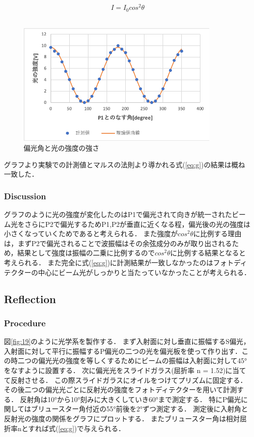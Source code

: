 \documentclass[11pt, a4paper]{jsarticle}
\begin{document}
\begin{equation}
    I = I_0cos^2\theta \label{eq:g}
\end{equation}\\

\begin{figure}[htbp]
 \begin{center}
  \includegraphics[width=100mm]{fig18.png}
 \end{center}
 \caption{偏光角と光の強度の強さ}
 \label{fig:18}
\end{figure}

グラフより実験での計測値とマルスの法則より導かれる式(\ref{eq:g})の結果は概ね一致した．

\subsubsection{Discussion}
グラフのように光の強度が変化したのはP1で偏光されて向きが統一されたビーム光をさらにP2で偏光するためP1,P2が垂直に近くなる程，偏光後の光の強度は小さくなっていくためであると考えられる．
また強度が$cos^2\theta$に比例する理由は，まずP2で偏光されることで波振幅はその余弦成分のみが取り出されるため，結果として強度は振幅の二乗に比例するので$cos^2\theta$に比例する結果となると考えられる．
また完全に式(\ref{eq:g})に計測結果が一致しなかったのはフォトディテクターの中心にビーム光がしっかりと当たっていなかったことが考えられる．
\subsection{Reflection}
\subsubsection{Procedure}
図\ref{fig:19}のように光学系を製作する．
まず入射面に対し垂直に振幅するS偏光，入射面に対して平行に振幅するP偏光の二つの光を偏光板を使って作り出す．この時二つの偏光光の強度を等しくするためにビームの振幅は入射面に対して45°をなすように設置する．
次に偏光光をスライドガラス(屈折率 n = 1.52)に当てて反射させる．
この際スライドガラスにオイルをつけてプリズムに固定する．
その後二つの偏光光ごとに反射光の強度をフォトディテクターを用いて計測する．
反射角は10°から10°刻みに大きくしていき60°まで測定する．
特にP偏光に関してはブリュースター角付近の55°前後を2°ずつ測定する．
測定後に入射角と反射光の強度の関係をグラフにプロットする．
またブリュースター角は相対屈折率nとすれば式(\ref{eq:g})で与えられる．
\end{document}
